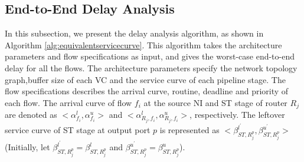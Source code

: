 \documentclass[preprint]{elsarticle}
\begin{document}
\subsection{End-to-End Delay Analysis}\label{e2elatency}
In this subsection, we present the delay analysis algorithm, as shown in Algorithm \ref{alg:equivalentservicecurve}. This algorithm takes the architecture parameters and flow specifications as input, and gives the worst-case end-to-end delay for all the flows. The architecture parameters specify the network topology graph,buffer size of each VC and the service curve of each pipeline stage. The flow specifications describes the arrival curve, routine, deadline and priority of each flow. The arrival curve of flow $f_i$ at the source NI and ST stage of router $R_j$ are denoted as $<\alpha_{f_i}^l,\alpha_{f_i}^u>$ and $<\alpha_{R_j,f_i}^l,\alpha_{R_j,f_i}^u>$, respectively. The leftover service curve of ST stage at output port $p$ is represented as $<\beta_{ST,R_j^{p}}^{l^\prime},\beta_{ST,R_j^{p}}^{u^\prime}>$ (Initially, let $\beta_{ST,R_j^{p}}^{l^\prime}=\beta_{ST,R_j^{p}}^{l}$ and $\beta_{ST,R_j^{p}}^{u^\prime}=\beta_{ST,R_j^{p}}^{u}$).
\end{document}
